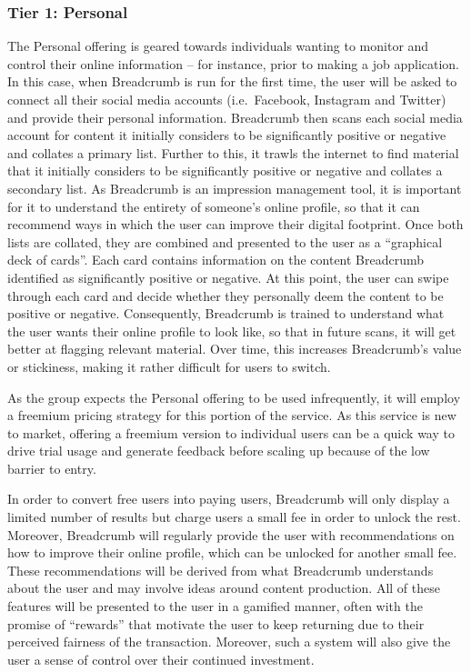 \subsubsection{Tier 1: Personal}

The Personal offering is geared towards individuals wanting to monitor and control their online information -- for instance, prior to making a job application. In this case, when Breadcrumb is run for the first time, the user will be asked to connect all their social media accounts (i.e.~Facebook, Instagram and Twitter) and provide their personal information. Breadcrumb then scans each social media account for content it initially considers to be significantly positive or negative and collates a primary list. Further to this, it trawls the internet to find material that it initially considers to be significantly positive or negative and collates a secondary list. As Breadcrumb is an impression management tool, it is important for it to understand the entirety of someone's online profile, so that it can recommend ways in which the user can improve their digital footprint. Once both lists are collated, they are combined and presented to the user as a ``graphical deck of cards''. Each card contains information on the content Breadcrumb identified as significantly positive or negative. At this point, the user can swipe through each card and decide whether they personally deem the content to be positive or negative. Consequently, Breadcrumb is trained to understand what the user wants their online profile to look like, so that in future scans, it will get better at flagging relevant material. Over time, this increases Breadcrumb's value or stickiness, making it rather difficult for users to switch.

As the group expects the Personal offering to be used infrequently, it will employ a freemium pricing strategy for this portion of the service. As this service is new to market, offering a freemium version to individual users can be a quick way to drive trial usage and generate feedback before scaling up because of the low barrier to entry.

In order to convert free users into paying users, Breadcrumb will only display a limited number of results but charge users a small fee in order to unlock the rest. Moreover, Breadcrumb will regularly provide the user with recommendations on how to improve their online profile, which can be unlocked for another small fee. These recommendations will be derived from what Breadcrumb understands about the user and may involve ideas around content production. All of these features will be presented to the user in a gamified manner, often with the promise of ``rewards'' that motivate the user to keep returning due to their perceived fairness of the transaction. Moreover, such a system will also give the user a sense of control over their continued investment.

